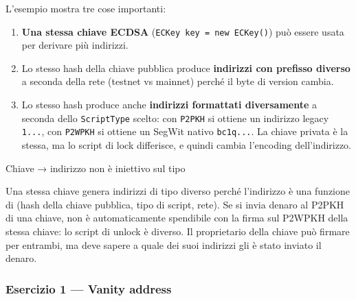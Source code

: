 \documentclass[
  italian,
  openany]{book}
\providecommand{\tightlist}{%
  \setlength{\itemsep}{0pt}\setlength{\parskip}{0pt}}
\begin{document}
L'esempio mostra tre cose importanti:

\begin{enumerate}
\def\labelenumi{\arabic{enumi}.}
\tightlist
\item
  \textbf{Una stessa chiave ECDSA}
  (\texttt{ECKey\ key\ =\ new\ ECKey()}) può essere usata per derivare
  più indirizzi.
\item
  Lo stesso hash della chiave pubblica produce \textbf{indirizzi con
  prefisso diverso} a seconda della rete (testnet vs mainnet) perché il
  byte di version cambia.
\item
  Lo stesso hash produce anche \textbf{indirizzi formattati
  diversamente} a seconda dello \texttt{ScriptType} scelto: con
  \texttt{P2PKH} si ottiene un indirizzo legacy \texttt{1...}, con
  \texttt{P2WPKH} si ottiene un SegWit nativo \texttt{bc1q...}. La
  chiave privata è la stessa, ma lo script di lock differisce, e quindi
  cambia l'encoding dell'indirizzo.
\end{enumerate}

\begin{callouttip}{Chiave → indirizzo non è iniettivo sul tipo}

Una stessa chiave genera indirizzi di tipo diverso perché l'indirizzo è
una funzione di (hash della chiave pubblica, tipo di script, rete). Se
si invia denaro al P2PKH di una chiave, non è automaticamente spendibile
con la firma sul P2WPKH della stessa chiave: lo script di unlock è
diverso. Il proprietario della chiave può firmare per entrambi, ma deve
sapere a quale dei suoi indirizzi gli è stato inviato il denaro.

\end{callouttip}

\subsubsection{Esercizio 1 --- Vanity
address}\label{esercizio-1-vanity-address}
\end{document}
